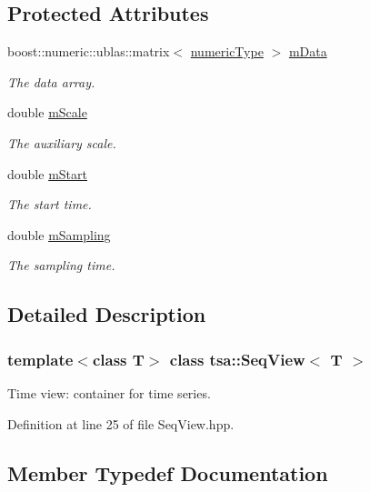 \subsection*{Protected Attributes}
\begin{DoxyCompactItemize}
\item 
boost\+::numeric\+::ublas\+::matrix$<$ \hyperlink{classtsa_1_1_seq_view_a72b689db78d0feea3305e62cc3852a1d}{numeric\+Type} $>$ \hyperlink{classtsa_1_1_seq_view_a7534776ab98f82620fd02d021309251a}{m\+Data}
\begin{DoxyCompactList}\small\item\em The data array. \end{DoxyCompactList}\item 
double \hyperlink{classtsa_1_1_seq_view_ac581e81bc585bf0b3587b728c51b5cd5}{m\+Scale}
\begin{DoxyCompactList}\small\item\em The auxiliary scale. \end{DoxyCompactList}\item 
double \hyperlink{classtsa_1_1_seq_view_a08dbe816c3c5acbf43fbce7205a9dccb}{m\+Start}
\begin{DoxyCompactList}\small\item\em The start time. \end{DoxyCompactList}\item 
double \hyperlink{classtsa_1_1_seq_view_a824069f8c77d6971304be1005244e490}{m\+Sampling}
\begin{DoxyCompactList}\small\item\em The sampling time. \end{DoxyCompactList}\end{DoxyCompactItemize}


\subsection{Detailed Description}
\subsubsection*{template$<$class T$>$\newline
class tsa\+::\+Seq\+View$<$ T $>$}

Time view\+: container for time series. 

Definition at line 25 of file Seq\+View.\+hpp.



\subsection{Member Typedef Documentation}
\mbox{\label{classtsa_1_1_seq_view_a2402583f29cfbb491586ab529be3e27f}} 
